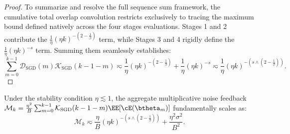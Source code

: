 \begin{proof}
To summarize and resolve the full sequence sum framework, the cumulative total overlap convolution restricts exclusively to tracing the maximum bound defined natively across the four stages evaluations. Stages 1 and 2 contribute the $\frac{1}{\eta} (\eta k)^{-\left(2-\frac{1}{\beta}\right)}$ term, while Stages 3 and 4 rigidly define the $\frac{1}{\eta} (\eta k)^{-s}$ term. Summing them seamlessly establishes:
\[
    \sum_{m=0}^{k-1} \mathcal{D}_{\mathrm{SGD}}(m) \mathcal{K}_{\mathrm{SGD}}(k-1-m) \eqsim \frac{1}{\eta} (\eta k)^{-\left(2-\frac{1}{\beta}\right)} + \frac{1}{\eta} (\eta k)^{-s} \eqsim \frac{1}{\eta} (\eta k)^{-\left(s \wedge \left(2-\frac{1}{\beta}\right)\right)}.
\]
\end{proof}

\begin{proposition}
\label{prop:sgd_self_noise_bounds}
Under the stability condition $\eta \lesssim 1$, the aggregate multiplicative noise feedback $\mathcal{M}_k = \frac{\eta^2}{B} \sum_{m=0}^{k-1} \mathcal{K}_{\mathrm{SGD}}(k-1-m) \EE[\cE(\btheta_m)]$ fundamentally scales as:
\begin{equation*}
    \mathcal{M}_k \eqsim \frac{\eta}{B} (\eta k)^{-\left(s \wedge \left(2-\frac{1}{\beta}\right)\right)} + \frac{\eta^2 \sigma^2}{B^2}.
\end{equation*}
\end{proposition}
